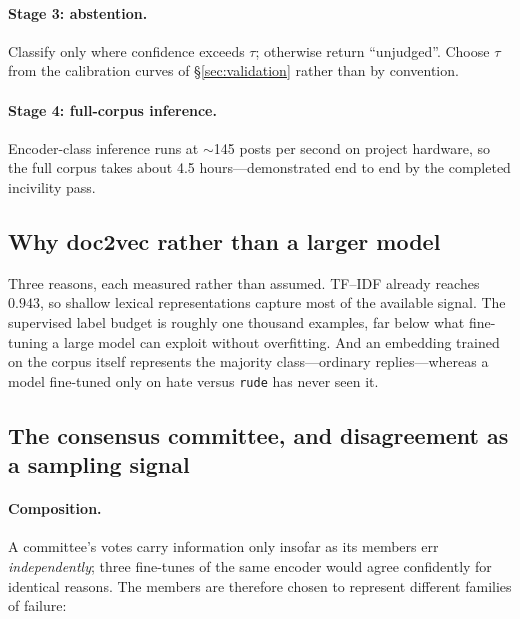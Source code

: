 \documentclass[11pt,a4paper]{article}
\begin{document}
\paragraph{Stage 3: abstention.} Classify only where confidence exceeds $\tau$;
otherwise return ``unjudged''. Choose $\tau$ from the calibration curves of
\S\ref{sec:validation} rather than by convention.

\paragraph{Stage 4: full-corpus inference.} Encoder-class inference runs at
$\sim$145 posts per second on project hardware, so the full corpus takes about
4.5 hours---demonstrated end to end by the completed incivility pass.

\subsection{Why doc2vec rather than a larger model}

Three reasons, each measured rather than assumed. TF--IDF already reaches $0.943$,
so shallow lexical representations capture most of the available signal. The
supervised label budget is roughly one thousand examples, far below what fine-tuning
a large model can exploit without overfitting. And an embedding trained on the corpus
itself represents the majority class---ordinary replies---whereas a model fine-tuned
only on hate versus \texttt{rude} has never seen it.

\subsection{The consensus committee, and disagreement as a sampling signal}
\label{sec:committee}

\paragraph{Composition.} A committee's votes carry information only insofar as its
members err \emph{independently}; three fine-tunes of the same encoder would agree
confidently for identical reasons. The members are therefore chosen to represent
different families of failure:
\end{document}

